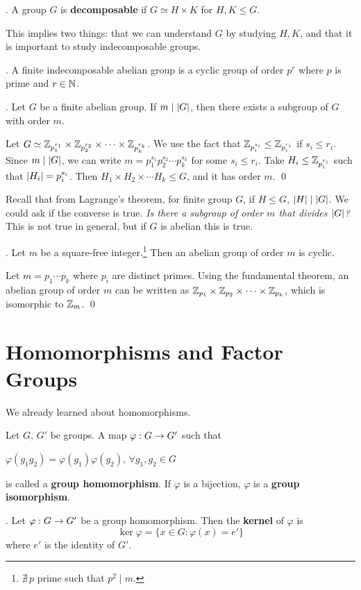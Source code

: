 .  A group \(G\) is \textbf{decomposable} if \(G \simeq H \times K\) for \(H, K \leq G\).

This implies two things: that we can understand \(G\) by studying \(H, K\), and that it is important to study indecomposable groups.

\thm. A finite indecomposable abelian group is a cyclic group of order \(p^r\) where \(p\) is prime and \(r \in \mathbb{N}\).

\thm. Let \(G\) be a finite abelian group. If \(m \mid \left| G \right|\), then there exists a subgroup of \(G\) with order \(m\).

\pf Let \(G \simeq \mathbb{Z}_{p_1^{r_1}} \times \mathbb{Z}_{p_2^{r_2}} \times \cdots \times \mathbb{Z}_{p_k^{r_k}}\). We use the fact that \(\mathbb{Z}_{p_i^{s_i}} \leq \mathbb{Z}_{p_i^{r_i}}\) if \(s_i \leq r_i\). Since \(m \mid \left| G \right|\), we can write \(m = p_1^{s_1}p_2^{s_2} \cdots p_k^{s_k}\) for some \(s_i \leq r_i\). Take \(H_i \leq \mathbb{Z}_{p_i^{r_i}}\) such that \(\left| H_i \right| = p_i^{s_i}\). Then \(H_1 \times H_2 \times \cdots H_k \leq G\), and it has order \(m\). \qed

Recall that from Lagrange's theorem, for finite group \(G\), if \(H \leq G\), \(\left| H \right| \mid \left| G \right|\). We could ask if the converse is true. \textit{Is there a subgroup of order \(m\) that divides \(\left| G \right|\)?} This is not true in general, but if \(G\) is abelian this is true.

\thm. Let \(m\) be a square-free integer.\footnote{\(\nexists\, p\) prime such that \(p^2 \mid m\).} Then an abelian group of order \(m\) is cyclic.

\pf Let \(m = p_1 \cdots p_k\) where \(p_i\) are distinct primes. Using the fundamental theorem, an abelian group of order \(m\) can be written as \(\mathbb{Z}_{p_1} \times \mathbb{Z}_{p_2} \times \cdots \times \mathbb{Z}_{p_k}\), which is isomorphic to \(\mathbb{Z}_m\). \qed

\pagebreak

\setcounter{topic}{12}
\chapter{Homomorphisms and Factor Groups}


We already learned about homomorphisms.

\recall Let \(G\), \(G'\) be groups. A map \(\varphi: G \rightarrow G'\) such that
\begin{center}
    \(\varphi(g_1 g_2) = \varphi(g_1) \varphi(g_2)\), \quad \(\forall g_1, g_2 \in G\)
\end{center}
is called a \textbf{group homomorphism}. If \(\varphi\) is a bijection, \(\varphi\) is a \textbf{group isomorphism}.

.  Let \(\varphi: G \rightarrow G'\) be a group homomorphism. Then the \textbf{kernel} of \(\varphi\) is
\[
    \ker \varphi = \{x \in G : \varphi(x) = e'\}
\]
where \(e'\) is the identity of \(G'\).

\pagebreak
